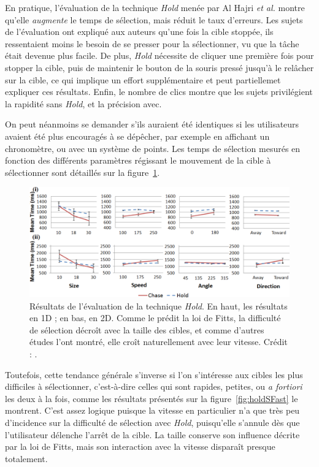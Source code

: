 	En pratique, l'évaluation de la technique \emph{Hold} menée par Al Hajri \emph{et al.} montre qu'elle \emph{augmente} le temps de sélection, mais réduit le taux d'erreurs. Les sujets de l'évaluation ont expliqué aux auteurs qu'une fois la cible stoppée, ils ressentaient moins le besoin de se presser pour la sélectionner, vu que la tâche était devenue plus facile. De plus, \emph{Hold} nécessite de cliquer une première fois pour stopper la cible, puis de maintenir le bouton de la souris pressé jusqu'à le relâcher sur la cible, ce qui implique un effort supplémentaire et peut partiellemet expliquer ces résultats. Enfin, le nombre de clics montre que les sujets privilégient la rapidité sans \emph{Hold}, et la précision avec.
	
	On peut néanmoins se demander s'ils auraient été identiques si les utilisateurs avaient été plus encouragés à se dépêcher, par exemple en affichant un chronomètre, ou avec un système de points. Les temps de sélection mesurés en fonction des différents paramètres régissant le mouvement de la cible à sélectionner sont détaillés sur la figure~\ref{fig:holdRes}.
	
	\begin{figure}[!htb]
		\centering
		\includegraphics[width=\textwidth]{figures/ch2/holdRes}
		\caption[\emph{Hold} -- évaluation]{Résultats de l'évaluation de la technique \emph{Hold}. En haut, les résultats en 1D ; en bas, en 2D. Comme le prédit la loi de Fitts, la difficulté de sélection décroît avec la taille des cibles, et comme d'autres études l'ont montré, elle croît naturellement avec leur vitesse.  Crédit : \cite{hajri2011moving}.}
		\label{fig:holdRes}
	\end{figure}
	
	Toutefois, cette tendance générale s'inverse si l'on s'intéresse aux cibles les plus difficiles à sélectionner, c'est-à-dire celles qui sont rapides, petites, ou \emph{a fortiori} les deux à la fois, comme les résultats présentés sur la figure~\ref{fig:holdSFast} le montrent. C'est assez logique puisque la vitesse en particulier n'a que très peu d'incidence sur la difficulté de sélection avec \emph{Hold}, puisqu'elle s'annule dès que l'utilisateur délenche l'arrêt de la cible. La taille conserve son influence décrite par la loi de Fitts, mais son interaction avec la vitesse disparaît presque totalement.
	
